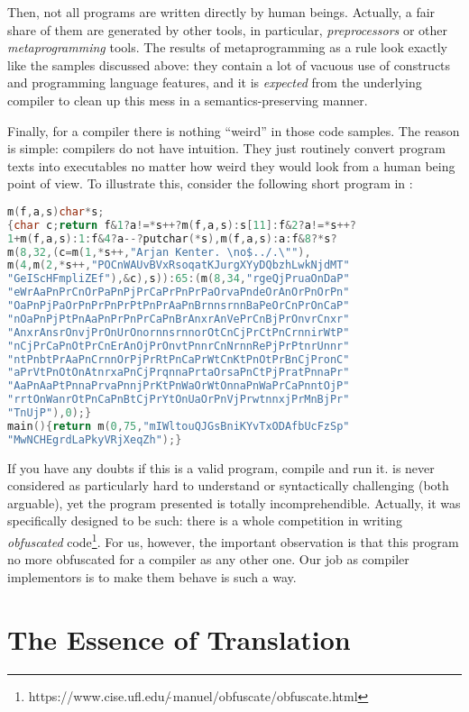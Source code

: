 Then, not all programs are written directly by human beings. Actually, a fair share of them are generated by other tools, in particular, \emph{preprocessors}
or other \emph{metaprogramming} tools. The results of metaprogramming as a rule look exactly like the samples discussed above: they contain a lot
of vacuous use of constructs and programming language features, and it is \emph{expected} from the underlying compiler to clean up this mess
in a semantics-preserving manner.

Finally, for a compiler there is nothing ``weird'' in those code samples. The reason is simple: compilers do not have intuition. They just 
routinely convert program texts into executables no matter how weird they would look from a human being point of view. To illustrate this,
consider the following short program in : 

\begin{lstlisting}[language=cc]
m(f,a,s)char*s;
{char c;return f&1?a!=*s++?m(f,a,s):s[11]:f&2?a!=*s++?
1+m(f,a,s):1:f&4?a--?putchar(*s),m(f,a,s):a:f&8?*s?
m(8,32,(c=m(1,*s++,"Arjan Kenter. \no$../.\""),
m(4,m(2,*s++,"POCnWAUvBVxRsoqatKJurgXYyDQbzhLwkNjdMT"
"GeIScHFmpliZEf"),&c),s)):65:(m(8,34,"rgeQjPruaOnDaP"
"eWrAaPnPrCnOrPaPnPjPrCaPrPnPrPaOrvaPndeOrAnOrPnOrPn"
"OaPnPjPaOrPnPrPnPrPtPnPrAaPnBrnnsrnnBaPeOrCnPrOnCaP"
"nOaPnPjPtPnAaPnPrPnPrCaPnBrAnxrAnVePrCnBjPrOnvrCnxr"
"AnxrAnsrOnvjPrOnUrOnornnsrnnorOtCnCjPrCtPnCrnnirWtP"
"nCjPrCaPnOtPrCnErAnOjPrOnvtPnnrCnNrnnRePjPrPtnrUnnr"
"ntPnbtPrAaPnCrnnOrPjPrRtPnCaPrWtCnKtPnOtPrBnCjPronC"
"aPrVtPnOtOnAtnrxaPnCjPrqnnaPrtaOrsaPnCtPjPratPnnaPr"
"AaPnAaPtPnnaPrvaPnnjPrKtPnWaOrWtOnnaPnWaPrCaPnntOjP"
"rrtOnWanrOtPnCaPnBtCjPrYtOnUaOrPnVjPrwtnnxjPrMnBjPr"
"TnUjP"),0);}
main(){return m(0,75,"mIWltouQJGsBniKYvTxODAfbUcFzSp"
"MwNCHEgrdLaPkyVRjXeqZh");}
\end{lstlisting}

If you have any doubts if this is a valid  program, compile and run it.  is never considered as particularly hard to
understand or syntactically challenging (both arguable), yet the program presented is totally incomprehendible. Actually, it
was specifically designed to be such: there is a whole competition in writing \emph{obfuscated}
code\footnote{https://www.cise.ufl.edu/$\tilde\,$manuel/obfuscate/obfuscate.html}. For us, however, the important observation is that this
program no more obfuscated for a compiler as any other one. Our job as compiler implementors is to make them behave is such a way.


\section{The Essence of Translation}

